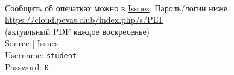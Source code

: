 \tableofcontents
{}
\vfill ~
\begin{center}
Сообщить об опечатках можно в \href{http://cloud.pevas.club:10080/tiulpin/PLT/issues}{Issues}. Пароль/логин ниже.\\
\url{https://cloud.pevas.club/index.php/s/PLT} \\ 
(актуальный PDF каждое воскресенье) \\
\href{http://cloud.pevas.club:10080/tiulpin/PLT}{Source} | \href{http://cloud.pevas.club:10080/tiulpin/PLT/issues}{Issues}\\
Username: \verb|student| \\
Password: \verb|0|
\end{center}
